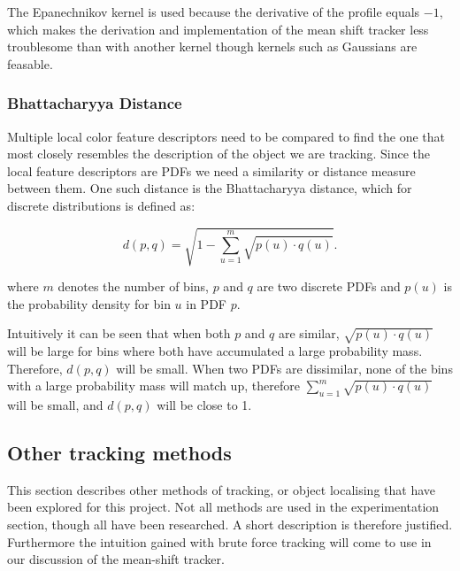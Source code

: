\documentclass[a4paper,11pt]{article}
\begin{document}
The Epanechnikov kernel is used because the derivative of the profile equals $-1$, which makes the derivation and implementation of the mean shift tracker less troublesome than with another kernel though kernels such as Gaussians are feasable.



\subsubsection{Bhattacharyya Distance}

Multiple local color feature descriptors need to be compared to find the one that most closely resembles the description of the object we are tracking. Since the local feature descriptors are PDFs we need a similarity or distance measure between them. One such distance is the Bhattacharyya distance, which for discrete distributions is defined as:



\begin{equation}
\label{eq:bhattdistance}
d(p,q) = \sqrt{1-\sum_{u=1}^{m} \sqrt{p(u)\cdot q(u)}}.
\end{equation}

where $m$ denotes the number of bins, $p$ and $q$ are two discrete PDFs and $p(u)$ is the probability density for bin $u$ in PDF $p$. 



Intuitively it can be seen that when both $p$ and $q$ are similar, $\sqrt{p(u)\cdot q(u)}$ will be large for bins where both have accumulated a large probability mass. Therefore, $d(p,q)$ will be small. When two PDFs are dissimilar, none of the bins with a large probability mass will match up, therefore  $\sum_{u=1}^{m} \sqrt{p(u)\cdot q(u)}$ will be small, and $d(p,q)$ will be close to 1.






\subsection{Other tracking methods}

This section describes other methods of tracking, or object localising that have been explored for this project. Not all methods are used in the experimentation section, though all have been researched. A short description is therefore justified. Furthermore the intuition gained with brute force tracking will come to use in our discussion of the mean-shift tracker.
\end{document}
